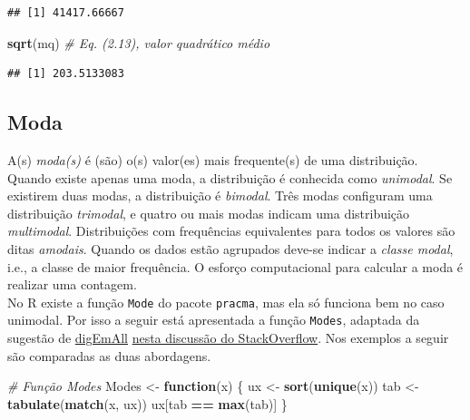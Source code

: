 \documentclass[
]{book}
\newenvironment{Shaded}{\begin{snugshade}}{\end{snugshade}}
\newcommand{\CommentTok}[1]{\textcolor[rgb]{0.56,0.35,0.01}{\textit{#1}}}
\newcommand{\ControlFlowTok}[1]{\textcolor[rgb]{0.13,0.29,0.53}{\textbf{#1}}}
\newcommand{\KeywordTok}[1]{\textcolor[rgb]{0.13,0.29,0.53}{\textbf{#1}}}
\newcommand{\NormalTok}[1]{#1}
\newcommand{\OperatorTok}[1]{\textcolor[rgb]{0.81,0.36,0.00}{\textbf{#1}}}
\newcommand{\StringTok}[1]{\textcolor[rgb]{0.31,0.60,0.02}{#1}}
\theoremstyle{definition}
\theoremstyle{definition}
\theoremstyle{definition}
\theoremstyle{remark}
\begin{document}
\begin{verbatim}
## [1] 41417.66667
\end{verbatim}

\begin{Shaded}
\begin{Highlighting}[]
\KeywordTok{sqrt}\NormalTok{(mq)                        }\CommentTok{\# Eq. (2.13), valor quadrático médio}
\end{Highlighting}
\end{Shaded}

\begin{verbatim}
## [1] 203.5133083
\end{verbatim}

\hypertarget{moda}{%
\subsection{Moda}\label{moda}}

A(s) \emph{moda(s)} é (são) o(s) valor(es) mais frequente(s) de uma distribuição. Quando existe apenas uma moda, a distribuição é conhecida como \emph{unimodal}. Se existirem duas modas, a distribuição é \emph{bimodal}. Três modas configuram uma distribuição \emph{trimodal}, e quatro ou mais modas indicam uma distribuição \emph{multimodal}. Distribuições com frequências equivalentes para todos os valores são ditas \emph{amodais}. Quando os dados estão agrupados deve-se indicar a \emph{classe modal}, i.e., a classe de maior frequência. O esforço computacional para calcular a moda é realizar uma contagem.\\
No R existe a função \texttt{Mode} do pacote \texttt{pracma}, mas ela só funciona bem no caso unimodal. Por isso a seguir está apresentada a função \texttt{Modes}, adaptada da sugestão de \href{https://stackoverflow.com/users/316644/digemall}{digEmAll} \href{https://stackoverflow.com/questions/2547402/how-to-find-the-statistical-mode}{nesta discussão do StackOverflow}. Nos exemplos a seguir são comparadas as duas abordagens.

\begin{Shaded}
\begin{Highlighting}[]
\CommentTok{\# Função Modes}
\NormalTok{Modes \textless{}{-}}\StringTok{ }\ControlFlowTok{function}\NormalTok{(x) \{}
\NormalTok{  ux \textless{}{-}}\StringTok{ }\KeywordTok{sort}\NormalTok{(}\KeywordTok{unique}\NormalTok{(x))}
\NormalTok{  tab \textless{}{-}}\StringTok{ }\KeywordTok{tabulate}\NormalTok{(}\KeywordTok{match}\NormalTok{(x, ux))}
\NormalTok{  ux[tab }\OperatorTok{==}\StringTok{ }\KeywordTok{max}\NormalTok{(tab)]}
\NormalTok{\}}
\end{Highlighting}
\end{Shaded}
\end{document}
